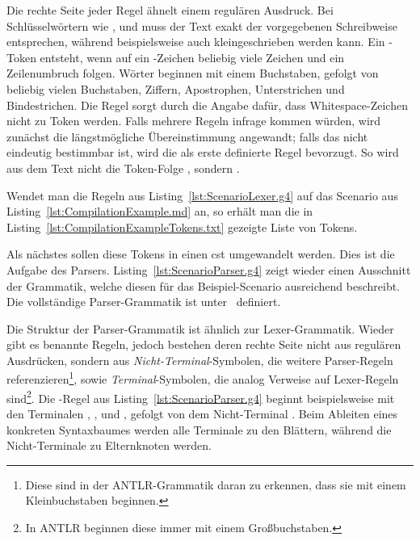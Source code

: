 Die rechte Seite jeder Regel ähnelt einem regulären Ausdruck.
Bei Schlüsselwörtern wie ,  und  muss der Text exakt der vorgegebenen Schreibweise entsprechen, während  beispielsweise auch kleingeschrieben werden kann.
Ein -Token entsteht, wenn auf ein \code{#}-Zeichen beliebig viele Zeichen und ein Zeilenumbruch folgen.
Wörter beginnen mit einem Buchstaben, gefolgt von beliebig vielen Buchstaben, Ziffern, Apostrophen, Unterstrichen und Bindestrichen.
Die Regel  sorgt durch die Angabe  dafür, dass Whitespace-Zeichen nicht zu Token werden.
Falls mehrere Regeln infrage kommen würden, wird zunächst die längstmögliche Übereinstimmung angewandt;
falls das nicht eindeutig bestimmbar ist, wird die als erste definierte Regel bevorzugt.
So wird aus dem Text  nicht die Token-Folge , sondern .

Wendet man die Regeln aus Listing~\ref{lst:ScenarioLexer.g4} auf das Scenario aus Listing~\ref{lst:CompilationExample.md} an, so erhält man die in Listing~\ref{lst:CompilationExampleTokens.txt} gezeigte Liste von Tokens.


Als nächstes sollen diese Tokens in einen \ac{cst} umgewandelt werden.
Dies ist die Aufgabe des Parsers.
Listing~\ref{lst:ScenarioParser.g4} zeigt wieder einen Ausschnitt der Grammatik, welche diesen für das Beispiel-Scenario ausreichend beschreibt.
Die vollständige Parser-Grammatik ist unter~\cite{parser-grammar} definiert.


Die Struktur der Parser-Grammatik ist ähnlich zur Lexer-Grammatik.
Wieder gibt es benannte Regeln, jedoch bestehen deren rechte Seite nicht aus regulären Ausdrücken, sondern aus \emph{Nicht-Terminal}-Symbolen, die weitere Parser-Regeln referenzieren\footnote{Diese sind in der ANTLR-Grammatik daran zu erkennen, dass sie mit einem Kleinbuchstaben beginnen.}, sowie \emph{Terminal}-Symbolen, die analog Verweise auf Lexer-Regeln sind\footnote{In ANTLR beginnen diese immer mit einem Großbuchstaben.}.
Die -Regel aus Listing~\ref{lst:ScenarioParser.g4} beginnt beispielsweise mit den Terminalen , ,  und , gefolgt von dem Nicht-Terminal .
Beim Ableiten eines konkreten Syntaxbaumes werden alle Terminale zu den Blättern, während die Nicht-Terminale zu Elternknoten werden.

